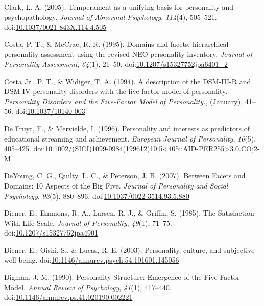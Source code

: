 \documentclass[,man,floatsintext]{apa6}
\theoremstyle{definition}
\theoremstyle{definition}
\theoremstyle{definition}
\theoremstyle{remark}
\begin{document}
\leavevmode\hypertarget{ref-Clark2005}{}%
Clark, L. A. (2005). Temperament as a unifying basis for personality and
psychopathology. \emph{Journal of Abnormal Psychology}, \emph{114}(4),
505--521.
doi:\href{https://doi.org/10.1037/0021-843X.114.4.505}{10.1037/0021-843X.114.4.505}

\leavevmode\hypertarget{ref-Costa1995}{}%
Costa, P. T., \& McCrae, R. R. (1995). Domains and facets: hierarchical
personality assessment using the revised NEO personality inventory.
\emph{Journal of Personality Assessment}, \emph{64}(1), 21--50.
doi:\href{https://doi.org/10.1207/s15327752jpa6401_2}{10.1207/s15327752jpa6401\_2}

\leavevmode\hypertarget{ref-Widiger1994}{}%
Costa Jr., P. T., \& Widiger, T. A. (1994). A description of the
DSM-III-R and DSM-IV personality disorders with the five-factor model of
personality. \emph{Personality Disorders and the Five-Factor Model of
Personality.}, (January), 41--56.
doi:\href{https://doi.org/10.1037/10140-003}{10.1037/10140-003}

\leavevmode\hypertarget{ref-DeFruyt1996}{}%
De Fruyt, F., \& Mervielde, I. (1996). Personality and interests as
predictors of educational streaming and achievement. \emph{European
Journal of Personality}, \emph{10}(5), 405--425.
doi:\href{https://doi.org/10.1002/(SICI)1099-0984(199612)10:5\%3C405::AID-PER255\%3E3.0.CO;2-M}{10.1002/(SICI)1099-0984(199612)10:5\textless{}405::AID-PER255\textgreater{}3.0.CO;2-M}

\leavevmode\hypertarget{ref-DeYoung2007}{}%
DeYoung, C. G., Quilty, L. C., \& Peterson, J. B. (2007). Between Facets
and Domains: 10 Aspects of the Big Five. \emph{Journal of Personality
and Social Psychology}, \emph{93}(5), 880--896.
doi:\href{https://doi.org/10.1037/0022-3514.93.5.880}{10.1037/0022-3514.93.5.880}

\leavevmode\hypertarget{ref-Diener1985}{}%
Diener, E., Emmons, R. A., Larsen, R. J., \& Griffin, S. (1985). The
Satisfaction With Life Scale. \emph{Journal of Personality},
\emph{49}(1), 71--75.
doi:\href{https://doi.org/10.1207/s15327752jpa4901}{10.1207/s15327752jpa4901}

\leavevmode\hypertarget{ref-Diener2003}{}%
Diener, E., Oishi, S., \& Lucas, R. E. (2003). Personality, culture, and
subjective well-being.
doi:\href{https://doi.org/10.1146/annurev.psych.54.101601.145056}{10.1146/annurev.psych.54.101601.145056}

\leavevmode\hypertarget{ref-Digman1990}{}%
Digman, J. M. (1990). Personality Structure: Emergence of the
Five-Factor Model. \emph{Annual Review of Psychology}, \emph{41}(1),
417--440.
doi:\href{https://doi.org/10.1146/annurev.ps.41.020190.002221}{10.1146/annurev.ps.41.020190.002221}
\end{document}
